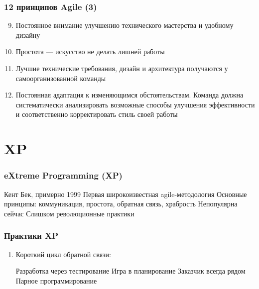 \documentclass{../../slides-style}
\begin{document}
    \begin{frame}
        \frametitle{12 принципов Agile (3)}
        \begin{enumerate}
            \setcounter{enumi}{8}
            \item Постоянное внимание улучшению технического мастерства и удобному дизайну
            \item Простота --- искусство не делать лишней работы
            \item Лучшие технические требования, дизайн и архитектура получаются у самоорганизованной команды
            \item Постоянная адаптация к изменяющимся обстоятельствам. Команда должна систематически анализировать возможные способы улучшения эффективности и соответственно корректировать стиль своей работы
        \end{enumerate}
    \end{frame}

    \section{XP}

    \begin{frame}
        \frametitle{eXtreme Programming (XP)}
        \begin{outline}
            \1 Кент Бек, примерно 1999
            \1 Первая широкоизвестная agile-методология
            \1 Основные принципы: коммуникация, простота, обратная связь, храбрость
            \1 Непопулярна сейчас
                \2 Слишком революционные практики
        \end{outline}
    \end{frame}

    \begin{frame}
        \frametitle{Практики XP}
        \begin{enumerate}
            \item Короткий цикл обратной связи:
            \begin{outline}
                \1 Разработка через тестирование 
                \1 Игра в планирование
                \1 Заказчик всегда рядом
                \1 Парное программирование
            \end{outline}
        \end{enumerate}
    \end{frame}
\end{document}
